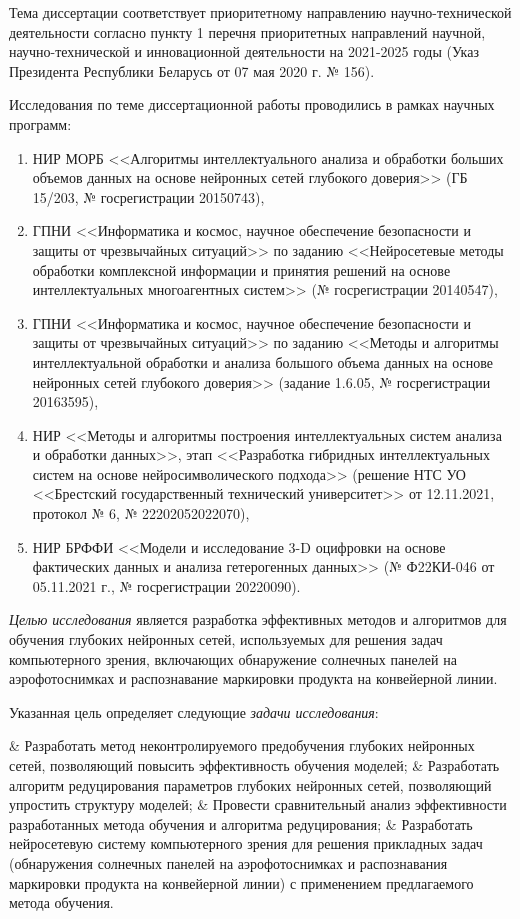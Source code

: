 {\actuality}
\vspace{3mm}

Тема диссертации соответствует приоритетному направлению научно-технической деятельности согласно пункту 1 перечня приоритетных направлений научной, научно-технической и инновационной деятельности на 2021-2025 годы  (Указ Президента Республики Беларусь от 07 мая 2020 г. № 156).

Исследования по теме диссертационной работы проводились в рамках научных программ:
\begin{enumerate}[wide, labelindent=10mm]
\item НИР МОРБ <<Алгоритмы интеллектуального анализа и обработки больших объемов данных на основе нейронных сетей глубокого доверия>> (ГБ 15/203, № госрегистрации 20150743),
\item ГПНИ <<Информатика и космос, научное обеспечение безопасности и защиты от чрезвычайных ситуаций>> по заданию <<Нейросетевые методы обработки комплексной информации и принятия решений на основе интеллектуальных многоагентных систем>> (№ госрегистрации 20140547),
\item ГПНИ <<Информатика и космос, научное обеспечение безопасности и защиты от чрезвычайных ситуаций>> по заданию <<Методы и алгоритмы интеллектуальной обработки и анализа большого объема данных на основе нейронных сетей глубокого доверия>> (задание 1.6.05, № госрегистрации 20163595),
\item НИР <<Методы и алгоритмы построения интеллектуальных систем анализа и обработки данных>>, этап <<Разработка гибридных интеллектуальных систем на основе нейросимволического подхода>> (решение НТС УО <<Брестский государственный технический университет>> от 12.11.2021, протокол № 6, № 22202052022070),
\item НИР БРФФИ <<Модели и исследование 3-D оцифровки на основе фактических данных и анализа гетерогенных данных>> (№ Ф22КИ-046 от 05.11.2021 г., № госрегистрации 20220090).
\end{enumerate}

\vspace{3mm}
\aim
\vspace{3mm}

\textit{Целью исследования} является разработка эффективных методов и алгоритмов для обучения глубоких нейронных сетей, используемых для решения задач компьютерного зрения, включающих обнаружение солнечных панелей на аэрофотоснимках и распознавание маркировки продукта на конвейерной линии.

Указанная цель определяет следующие \textit{задачи исследования}:
\begin{easylistNum}
	& Разработать метод неконтролируемого предобучения глубоких нейронных сетей, позволяющий повысить эффективность обучения моделей;
	& Разработать алгоритм редуцирования параметров глубоких нейронных сетей, позволяющий упростить структуру моделей;
	& Провести сравнительный анализ эффективности разработанных метода обучения и алгоритма редуцирования;
	& Разработать нейросетевую систему компьютерного зрения для решения прикладных задач (обнаружения солнечных панелей на аэрофотоснимках и распознавания маркировки продукта на конвейерной линии) с применением предлагаемого метода обучения.
\end{easylistNum}

